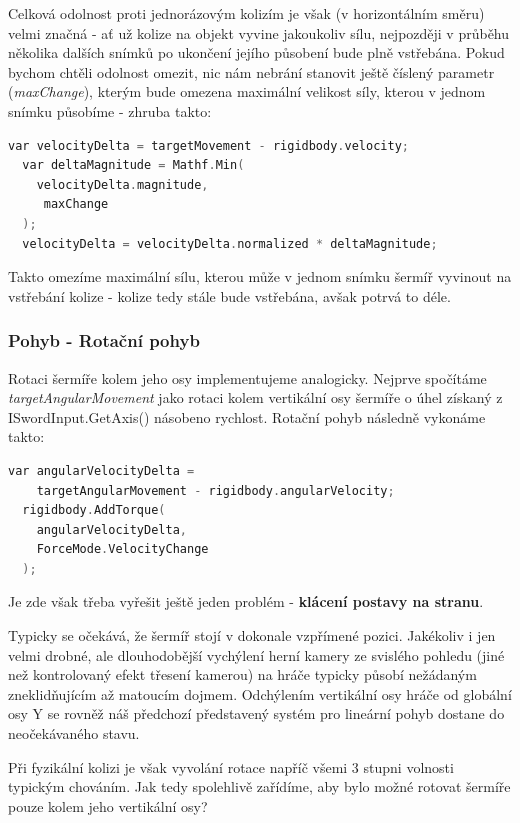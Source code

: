 Celková odolnost proti jednorázovým kolizím je však (v horizontálním směru) velmi značná - ať už kolize na objekt vyvine jakoukoliv sílu, nejpozději v průběhu několika dalších snímků po ukončení jejího působení bude plně vstřebána. Pokud bychom chtěli odolnost omezit, nic nám nebrání stanovit ještě číslený parametr (\textit{maxChange}), kterým bude omezena maximální velikost síly, kterou v jednom snímku působíme - zhruba takto:

\begin{lstlisting}[language=C, basicstyle=\fontsize{11}{13}\selectfont\ttfamily]
  var velocityDelta = targetMovement - rigidbody.velocity;
  var deltaMagnitude = Mathf.Min(
    velocityDelta.magnitude,
     maxChange
  );
  velocityDelta = velocityDelta.normalized * deltaMagnitude;
\end{lstlisting}

Takto omezíme maximální sílu, kterou může v jednom snímku šermíř vyvinout na vstřebání kolize - kolize tedy stále bude vstřebána, avšak potrvá to déle.

\subsubsection*{Pohyb - Rotační pohyb}
Rotaci šermíře kolem jeho osy implementujeme analogicky. Nejprve spočítáme \textit{targetAngularMovement} jako rotaci kolem vertikální osy šermíře o úhel získaný z ISwordInput.GetAxis() násobeno rychlost. Rotační pohyb následně vykonáme takto:

\begin{lstlisting}[language=C, basicstyle=\fontsize{11}{13}\selectfont\ttfamily]
  var angularVelocityDelta = 
    targetAngularMovement - rigidbody.angularVelocity;
  rigidbody.AddTorque(
    angularVelocityDelta,
    ForceMode.VelocityChange
  );
\end{lstlisting}

Je zde však třeba vyřešit ještě jeden problém - \textbf{klácení postavy na stranu}. 

Typicky se očekává, že šermíř stojí v dokonale vzpřímené pozici. Jakékoliv i jen velmi drobné, ale dlouhodobější vychýlení herní kamery ze svislého pohledu (jiné než kontrolovaný efekt třesení kamerou) na hráče typicky působí nežádaným zneklidňujícím až matoucím dojmem. Odchýlením vertikální osy hráče od globální osy Y se rovněž náš předchozí představený systém pro lineární pohyb dostane do neočekávaného stavu. 

Při fyzikální kolizi je však vyvolání rotace napříč všemi 3 stupni volnosti typickým chováním. Jak tedy spolehlivě zařídíme, aby bylo možné rotovat šermíře pouze kolem jeho vertikální osy?

